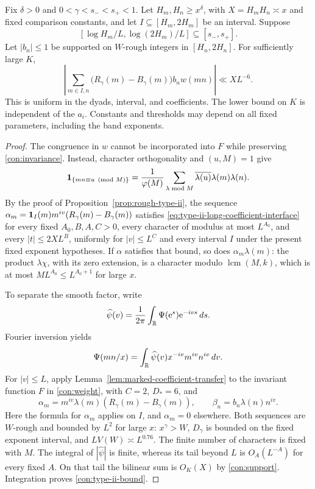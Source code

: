\begin{lemma}\label{con:type-ii}
Fix $\delta>0$ and $0<\gamma<s_-<s_+<1$. Let
$H_m,H_n\ge x^\delta$, with $X=H_mH_n\asymp x$ and fixed
comparison constants, and let $I\subseteq[H_m,2H_m]$ be an interval.
Suppose
\begin{equation}\label{con:exponent-range}
 [\log H_m/L,\log(2H_m)/L]\subseteq[s_-,s_+].
\end{equation}
Let \(|b_n|\le1\) be supported on \(W\)-rough integers in
\([H_n,2H_n]\).  For sufficiently large \(K\),
\begin{equation}\label{con:type-ii-bound}
 \left|\sum_{m\in I,n}
       \bigl(R_\gamma(m)-B_\gamma(m)\bigr)b_n w(mn)\right|
       \ll XL^{-6}.
\end{equation}
This is uniform in the dyads, interval, and coefficients.  The
lower bound on \(K\) is independent of the \(a_i\). Constants and
thresholds may depend on all fixed parameters, including the band
exponents.
\end{lemma}

\begin{proof}
The congruence in \(w\) cannot be incorporated into \(F\) while
preserving \eqref{con:invariance}.  Instead, character orthogonality
and \((u,M)=1\) give
\[
 \mathbf{1}_{\{mn\equiv u\pmod M\}}
 =\frac1{\varphi(M)}\sum_{\lambda\bmod M}
             \overline{\lambda(u)}\lambda(m)\lambda(n).
\]
By the proof of Proposition~\ref{prop:rough-type-ii}, the sequence
$\alpha_m=\mathbf{1}_I(m)m^{iv}(R_\gamma(m)-B_\gamma(m))$ satisfies
\eqref{eq:type-ii-long-coefficient-interface} for every fixed
$A_0,B,A,C>0$, every character of modulus at most $L^{A_0}$,
and every $|t|\le2XL^B$, uniformly for $|v|\le L^C$ and every
interval $I$ under the present fixed exponent hypotheses.
If $\alpha$ satisfies that bound, so does
\(\alpha_m\lambda(m)\): the product \(\lambda\chi\), with its
zero extension, is a character modulo \(\operatorname{lcm}(M,k)\),
which is at most \(ML^{A_0}\le L^{A_0+1}\) for large \(x\).

To separate the smooth factor, write
\[
 \widehat\psi(v)=\frac1{2\pi}\int_{\mathbb{R}}\Psi(\mathrm{e}^s)\mathrm{e}^{-ivs}\,ds.
\]
Fourier inversion yields
\[
 \Psi(mn/x)=\int_{\mathbb{R}}\widehat\psi(v)x^{-iv}m^{iv}n^{iv}\,dv.
\]
For \(|v|\le L\), apply Lemma~\ref{lem:marked-coefficient-transfer}
to the invariant function $F$ in \eqref{con:weight}, with
\(C=2\), \(D_*=6\), and
\[
 \alpha_m=m^{iv}\lambda(m)
                   (R_\gamma(m)-B_\gamma(m)),\qquad
 \beta_n=b_n\lambda(n)n^{iv}.
\]
Here the formula for \(\alpha_m\) applies on \(I\), and
\(\alpha_m=0\) elsewhere.
Both sequences are \(W\)-rough and bounded by \(L^2\) for large
\(x\): \(x^\gamma>W\), \(D_\gamma\) is bounded on the fixed
exponent interval, and \(LV(W)\asymp L^{0.76}\).  The finite
number of characters is fixed with \(M\).  The integral of
\(|\widehat\psi|\) is finite, whereas its tail beyond \(L\) is
\(O_A(L^{-A})\) for every fixed \(A\).  On that tail the bilinear
sum is \(O_K(X)\) by \eqref{con:support}.  Integration proves
\eqref{con:type-ii-bound}.
\end{proof}

